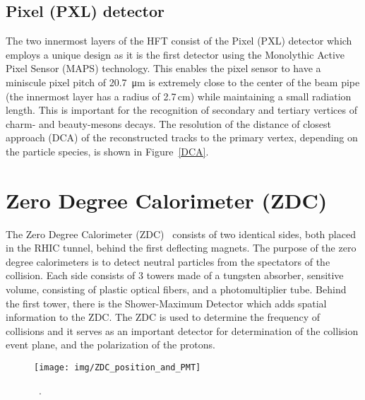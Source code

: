 \subsection{Pixel (PXL) detector}
The two innermost layers of the HFT consist of the Pixel (PXL) detector which employs a unique design as it is the
first detector using the Monolythic Active Pixel Sensor (MAPS)
technology. This enables the pixel sensor to have a miniscule pixel pitch of \SI{20.7}{\micro\metre} is extremely close to the center of the beam pipe (the innermost layer has a radius of 2.7$\,$cm) while maintaining
a small radiation length. This is important for the recognition of secondary and tertiary vertices of charm- and beauty-mesons
decays. The resolution of the distance of closest approach (DCA) of the reconstructed 
tracks to the primary vertex, depending on the particle species, is shown in Figure~\ref{DCA}.



\section{Zero Degree Calorimeter (ZDC)\label{ZDCsection}} 
The Zero Degree Calorimeter (ZDC)~\cite{ZDC, ZDCSMD} consists of two identical sides, both placed in the RHIC tunnel, behind 
the first deflecting magnets. The purpose of the zero degree calorimeters is to detect neutral particles from the spectators of 
the collision. Each side consists of 3 towers made of a tungsten absorber, sensitive volume, consisting of plastic optical fibers, and a photomultiplier tube.
Behind the first tower, there is the Shower-Maximum Detector which adds spatial information to the ZDC\@. The ZDC is used
to determine the frequency of collisions and it serves as an important detector for determination of the collision event plane, and the polarization of the protons.

\begin{figure}[!htb]
\begin{center}
  \texttt{[image: img/ZDC\_position\_and\_PMT]}\\
\end{center}
\caption{\label{ZDC_scheme}~\cite{ZDCphysics}. }
\end{figure}



